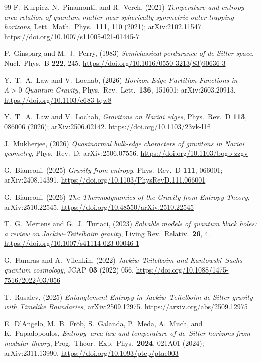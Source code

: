 \documentclass[11pt]{article}
\begin{document}
\begin{thebibliography}{99}
 F.~Kurpicz, N.~Pinamonti, and R.~Verch, (2021) \emph{Temperature and entropy--area relation of quantum matter near spherically symmetric outer trapping horizons}, Lett.\ Math.\ Phys.\ \textbf{111}, 110 (2021); arXiv:2102.11547. \url{https://doi.org/10.1007/s11005-021-01445-7}

 P.~Ginsparg and M.~J.~Perry, (1983) \emph{Semiclassical perdurance of de Sitter space}, Nucl.\ Phys.\ B \textbf{222}, 245.
\url{https://doi.org/10.1016/0550-3213(83)90636-3}

 Y.~T.~A.~Law and V.~Lochab, (2026) \emph{Horizon Edge Partition Functions in $\Lambda>0$ Quantum Gravity}, Phys.\ Rev.\ Lett.\ \textbf{136}, 151601; arXiv:2603.20913.
\url{https://doi.org/10.1103/c683-tqw8}

 Y.~T.~A.~Law and V.~Lochab, \emph{Gravitons on Nariai edges}, Phys.\ Rev.\ D \textbf{113}, 086006 (2026); arXiv:2506.02142.
\url{https://doi.org/10.1103/23vk-l1fl}

 J.~Mukherjee, (2026) \emph{Quasinormal bulk-edge characters of gravitons in Nariai geometry}, Phys.\ Rev.\ D; arXiv:2506.07556.
\url{https://doi.org/10.1103/bqgb-zzgy}

 G.~Bianconi, (2025) \emph{Gravity from entropy}, Phys.\ Rev.\ D \textbf{111}, 066001; arXiv:2408.14391. \url{https://doi.org/10.1103/PhysRevD.111.066001}

 G.~Bianconi, (2026) \emph{The Thermodynamics of the Gravity from Entropy Theory}, arXiv:2510.22545.
\newline \url{https://doi.org/10.48550/arXiv.2510.22545}

 T.~G.~Mertens and G.~J.~Turiaci, (2023) \emph{Solvable models of quantum black holes: a review on Jackiw--Teitelboim gravity}, Living Rev.\ Relativ.\ \textbf{26}, 4.
\url{https://doi.org/10.1007/s41114-023-00046-1}

 G.~Fanaras and A.~Vilenkin, (2022) \emph{Jackiw--Teitelboim and Kantowski--Sachs quantum cosmology}, JCAP \textbf{03} (2022) 056.
\url{https://doi.org/10.1088/1475-7516/2022/03/056}

 T.~Rusalev, (2025) \emph{Entanglement Entropy in Jackiw--Teitelboim de Sitter gravity with Timelike Boundaries}, arXiv:2509.12975. \url{https://arxiv.org/abs/2509.12975}


 E.~D'Angelo, M.~B.~Fr\"ob, S.~Galanda, P.~Meda, A.~Much, and K.~Papadopoulos, \emph{Entropy--area law and temperature of de~Sitter horizons from modular theory}, Prog.\ Theor.\ Exp.\ Phys.\ \textbf{2024}, 021A01 (2024); arXiv:2311.13990. \url{https://doi.org/10.1093/ptep/ptae003}


\end{thebibliography}
\end{document}
